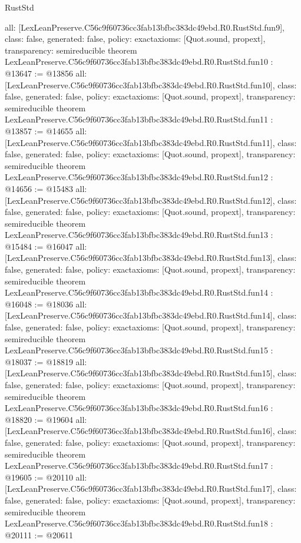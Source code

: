 \begin{lexlean}{RustStd}
\begin{coremodule}
{  all: [LexLeanPreserve.C56c9f60736cc3fab13bfbc383dc49ebd.R0.RustStd.fun9],
  class: false,
  generated: false,
  policy: exact{axioms: [Quot.sound, propext]},
  transparency: semireducible
}
theorem LexLeanPreserve.C56c9f60736cc3fab13bfbc383dc49ebd.R0.RustStd.fun10 : @13647 := @13856 {
  all: [LexLeanPreserve.C56c9f60736cc3fab13bfbc383dc49ebd.R0.RustStd.fun10],
  class: false,
  generated: false,
  policy: exact{axioms: [Quot.sound, propext]},
  transparency: semireducible
}
theorem LexLeanPreserve.C56c9f60736cc3fab13bfbc383dc49ebd.R0.RustStd.fun11 : @13857 := @14655 {
  all: [LexLeanPreserve.C56c9f60736cc3fab13bfbc383dc49ebd.R0.RustStd.fun11],
  class: false,
  generated: false,
  policy: exact{axioms: [Quot.sound, propext]},
  transparency: semireducible
}
theorem LexLeanPreserve.C56c9f60736cc3fab13bfbc383dc49ebd.R0.RustStd.fun12 : @14656 := @15483 {
  all: [LexLeanPreserve.C56c9f60736cc3fab13bfbc383dc49ebd.R0.RustStd.fun12],
  class: false,
  generated: false,
  policy: exact{axioms: [Quot.sound, propext]},
  transparency: semireducible
}
theorem LexLeanPreserve.C56c9f60736cc3fab13bfbc383dc49ebd.R0.RustStd.fun13 : @15484 := @16047 {
  all: [LexLeanPreserve.C56c9f60736cc3fab13bfbc383dc49ebd.R0.RustStd.fun13],
  class: false,
  generated: false,
  policy: exact{axioms: [Quot.sound, propext]},
  transparency: semireducible
}
theorem LexLeanPreserve.C56c9f60736cc3fab13bfbc383dc49ebd.R0.RustStd.fun14 : @16048 := @18036 {
  all: [LexLeanPreserve.C56c9f60736cc3fab13bfbc383dc49ebd.R0.RustStd.fun14],
  class: false,
  generated: false,
  policy: exact{axioms: [Quot.sound, propext]},
  transparency: semireducible
}
theorem LexLeanPreserve.C56c9f60736cc3fab13bfbc383dc49ebd.R0.RustStd.fun15 : @18037 := @18819 {
  all: [LexLeanPreserve.C56c9f60736cc3fab13bfbc383dc49ebd.R0.RustStd.fun15],
  class: false,
  generated: false,
  policy: exact{axioms: [Quot.sound, propext]},
  transparency: semireducible
}
theorem LexLeanPreserve.C56c9f60736cc3fab13bfbc383dc49ebd.R0.RustStd.fun16 : @18820 := @19604 {
  all: [LexLeanPreserve.C56c9f60736cc3fab13bfbc383dc49ebd.R0.RustStd.fun16],
  class: false,
  generated: false,
  policy: exact{axioms: [Quot.sound, propext]},
  transparency: semireducible
}
theorem LexLeanPreserve.C56c9f60736cc3fab13bfbc383dc49ebd.R0.RustStd.fun17 : @19605 := @20110 {
  all: [LexLeanPreserve.C56c9f60736cc3fab13bfbc383dc49ebd.R0.RustStd.fun17],
  class: false,
  generated: false,
  policy: exact{axioms: [Quot.sound, propext]},
  transparency: semireducible
}
theorem LexLeanPreserve.C56c9f60736cc3fab13bfbc383dc49ebd.R0.RustStd.fun18 : @20111 := @20611 {
}
\end{coremodule}
\end{lexlean}
